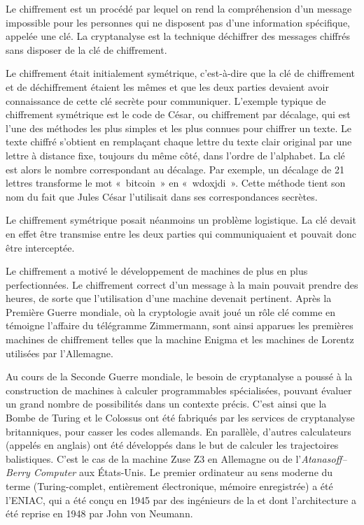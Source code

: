 Le chiffrement est un procédé par lequel on rend la compréhension d'un message impossible pour les personnes qui ne disposent pas d'une information spécifique, appelée une clé. La cryptanalyse est la technique déchiffrer des messages chiffrés sans disposer de la clé de chiffrement.

Le chiffrement était initialement symétrique, c'est-à-dire que la clé de chiffrement et de déchiffrement étaient les mêmes et que les deux parties devaient avoir connaissance de cette clé secrète pour communiquer. L'exemple typique de chiffrement symétrique est le code de César, ou chiffrement par décalage, qui est l'une des méthodes les plus simples et les plus connues pour chiffrer un texte. Le texte chiffré s'obtient en remplaçant chaque lettre du texte clair original par une lettre à distance fixe, toujours du même côté, dans l'ordre de l'alphabet. La clé est alors le nombre correspondant au décalage. Par exemple, un décalage de 21 lettres transforme le mot «~bitcoin~» en «~wdoxjdi~». Cette méthode tient son nom du fait que Jules César l'utilisait dans ses correspondances secrètes.

Le chiffrement symétrique posait néanmoins un problème logistique. La clé devait en effet être transmise entre les deux parties qui communiquaient et pouvait donc être interceptée. %

Le chiffrement a motivé le développement de machines de plus en plus perfectionnées. Le chiffrement correct d'un message à la main pouvait prendre des heures, de sorte que l'utilisation d'une machine devenait pertinent. Après la Première Guerre mondiale, où la cryptologie avait joué un rôle clé comme en témoigne l'affaire du télégramme Zimmermann, sont ainsi apparues les premières machines de chiffrement telles que la machine Enigma et les machines de Lorentz utilisées par l'Allemagne.

Au cours de la Seconde Guerre mondiale, le besoin de cryptanalyse a poussé à la construction de machines à calculer programmables spécialisées, pouvant évaluer un grand nombre de possibilités dans un contexte précis. C'est ainsi que la Bombe de Turing et le Colossus ont été fabriqués par les services de cryptanalyse britanniques, pour casser les codes allemands. En parallèle, d'autres calculateurs (appelés  en anglais) ont été développés dans le but de calculer les trajectoires balistiques. C'est le cas de la machine Zuse Z3 en Allemagne ou de l'\emph{Atanasoff–Berry Computer} aux États-Unis. Le premier ordinateur au sens moderne du terme (Turing-complet, entièrement électronique, mémoire enregistrée) a été l'ENIAC, qui a été conçu en 1945 par des ingénieurs de la  et dont l'architecture a été reprise en 1948 par John von Neumann.

